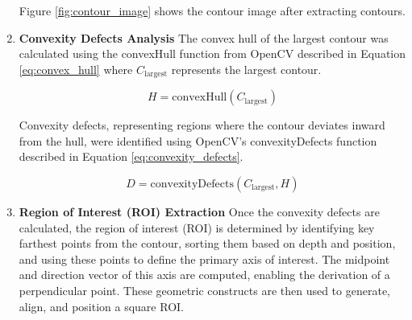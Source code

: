 \begin{enumerate}
    Figure \ref{fig:contour_image} shows the contour image after extracting contours.

    \item \textbf{Convexity Defects Analysis}
    The convex hull of the largest contour was calculated using the convexHull function from OpenCV described in Equation \ref{eq:convex_hull} where \( C_{\text{largest}} \) represents the largest contour.
    
    \begin{equation}
        H = \text{convexHull}(C_{\text{largest}})
        \label{eq:convex_hull}
    \end{equation}

    Convexity defects, representing regions where the contour deviates inward from the hull, were identified using OpenCV's convexityDefects function described in Equation \ref{eq:convexity_defects}.

    \begin{equation}
        D = \text{convexityDefects}(C_{\text{largest}}, H)
        \label{eq:convexity_defects}
    \end{equation}

    \item \textbf{Region of Interest (ROI) Extraction} 
    Once the convexity defects are calculated, the region of interest (ROI) is determined by identifying key farthest points from the contour, sorting them based on depth and position, and using these points to define the primary axis of interest. The midpoint and direction vector of this axis are computed, enabling the derivation of a perpendicular point. These geometric constructs are then used to generate, align, and position a square ROI.


\end{enumerate}
